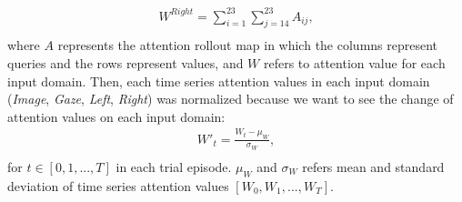 \documentclass[letterpaper, 10 pt, conference]{ieeeconf}  %
\renewcommand\hl[1]{#1} %
\begin{document}
\begin{equation}
\begin{aligned}
\label{eq:summed}
W^{Right} = \sum^{23}_{i=1} \sum^{23}_{j=14} A_{ij},\\
\end{aligned}
\end{equation}
where $A$ represents the attention rollout map in which the columns represent queries and the rows represent values, and $W$ refers to \hl{attention value for each input domain}.
\hl{Then, each time series attention values in each input domain (\textit{Image}, \textit{Gaze}, \textit{Left}, \textit{Right}) was normalized because we want to see the change of attention values on each input domain:}
\begin{equation}
\begin{aligned}
\label{eq:normed}
W'_t = \frac{W_t - \mu_W}{\sigma_W},\\
\end{aligned}
\end{equation}
\hl{for $t \in [0, 1, ..., T]$ in each trial episode. $\mu_W$ and $\sigma_W$ refers mean and standard deviation of time series attention values $[W_0, W_1, ..., W_T]$.}
\end{document}
